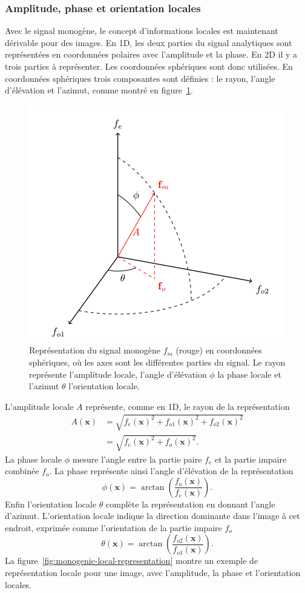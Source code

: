 \subsubsection{Amplitude, phase et orientation locales}

Avec le signal monogène, le concept d'informations locales est maintenant dérivable pour des images. En 1D, les deux parties du signal analytiques sont représentées en coordonnées polaires avec l'amplitude et la phase. En 2D il y a trois parties à représenter. Les coordonnées sphériques sont donc utilisées. En coordonnées sphériques trois composantes sont définies : le rayon, l'angle d'élévation et l'azimut, comme montré en figure~\ref{fig:spherical-representation}.

\bigskip

\begin{figure}
    \centering
    \includegraphics[width=.45\textwidth]{contenu/resources/images/spherical_representation}
    \caption[Représentation du signal monogène en coordonnées sphériques]{Représentation du signal monogène $f_m$ (rouge) en coordonnées sphériques, où les axes sont les différentes parties du signal. Le rayon représente l'amplitude locale, l'angle d'élévation $\phi$ la phase locale et l'azimut $\theta$ l'orientation locale.}
    \label{fig:spherical-representation}
\end{figure}

L'amplitude locale $A$ représente, comme en 1D, le rayon de la représentation
\begin{align*}
    A(\mathbf{x}) &= \sqrt{f_e(\mathbf{x})^2 + f_{o1}(\mathbf{x})^2 + f_{o2}(\mathbf{x})^2} \\
    &= \sqrt{f_e(\mathbf{x})^2 + f_o(\mathbf{x})^2}.
\end{align*}
La phase locale $\phi$ mesure l'angle entre la partie paire $f_e$ et la partie impaire combinée $f_o$. La phase représente ainsi l'angle d'élévation de la représentation
\begin{equation}
    \phi(\mathbf{x}) = \arctan\left(\frac{f_o(\mathbf{x})}{f_e(\mathbf{x})}\right).
\end{equation}
Enfin l'orientation locale $\theta$ complète la représentation en donnant l'angle d'azimut. L'orientation locale indique la direction dominante dans l'image à cet endroit, exprimée comme l'orientation de la partie impaire $f_o$
\begin{equation}
    \theta(\mathbf{x}) = \arctan\left(\frac{f_{o2}(\mathbf{x})}{f_{o1}(\mathbf{x})}\right).
\end{equation}
La figure~\ref{fig:monogenic-local-representation} montre un exemple de représentation locale pour une image, avec l'amplitude, la phase et l'orientation locales.

